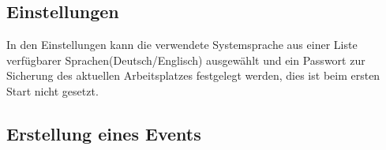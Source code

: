 \documentclass[11pt]{article}
\begin{document}
\subsection{Einstellungen}


\vspace{1cm}

In den Einstellungen kann die verwendete Systemsprache aus einer Liste verfügbarer Sprachen(Deutsch/Englisch) ausgewählt und ein Passwort zur Sicherung des aktuellen Arbeitsplatzes festgelegt werden, dies ist beim ersten Start nicht gesetzt.

\subsection{Erstellung eines Events}

\end{document}
